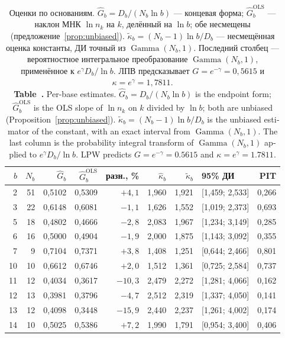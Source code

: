 \documentclass[11pt,a4paper]{article}
\newcommand{\encaptab}[1]{\\[3pt]\foreignlanguage{english}{%
  \textbf{Table~\thetable.} #1}}
\theoremstyle{plain}
\theoremstyle{remark}
\newcommand{\eg}{e^{\gamma}}
\newcommand{\emg}{e^{-\gamma}}
\DeclareMathOperator{\Gam}{Gamma}
\begin{document}
\begin{table}[t]
\centering
\caption{Оценки по основаниям. $\hat G_b=D_b/(N_b\ln b)$ --- концевая форма;
$\hat G_b^{\mathrm{OLS}}$ --- наклон МНК $\ln n_k$ на $k$, делённый на $\ln b$; обе
несмещены (предложение~\ref{prop:unbiased}). $\tilde\kappa_b=(N_b-1)\ln b/D_b$ ---
несмещённая оценка константы, ДИ точный из $\Gam(N_b,1)$. Последний столбец ---
вероятностное интегральное преобразование $\Gam(N_b,1)$, применённое к
$\eg D_b/\ln b$. ЛПВ предсказывает $G=\emg=0{,}5615$ и $\kappa=\eg=1{,}7811$.
\encaptab{Per-base estimates. $\hat G_b=D_b/(N_b\ln b)$ is the endpoint form;
$\hat G_b^{\mathrm{OLS}}$ is the OLS slope of $\ln n_k$ on $k$ divided by $\ln b$;
both are unbiased (Proposition~\ref{prop:unbiased}). $\tilde\kappa_b=(N_b-1)\ln b/D_b$
is the unbiased estimator of the constant, with an exact interval from $\Gam(N_b,1)$.
The last column is the probability integral transform of $\Gam(N_b,1)$ applied to
$\eg D_b/\ln b$. LPW predicts $G=\emg=0.5615$ and $\kappa=\eg=1.7811$.}}
\label{tab:bases}
\small
\begin{tabular}{rrrrrrrl r}
\toprule
$b$ & $N_b$ & $\hat G_b$ & $\hat G_b^{\mathrm{OLS}}$ & разн., \% &
$\hat\kappa_b$ & $\tilde\kappa_b$ & 95\% ДИ & PIT\\
\midrule
2 & 51 & 0{,}5102 & 0{,}5309 & $+4{,}1$ & 1{,}960 & 1{,}921 & [1{,}459; 2{,}533] & 0{,}266\\
3 & 22 & 0{,}6148 & 0{,}6081 & $-1{,}1$ & 1{,}626 & 1{,}552 & [1{,}019; 2{,}373] & 0{,}693\\
5 & 18 & 0{,}4802 & 0{,}4666 & $-2{,}8$ & 2{,}083 & 1{,}967 & [1{,}234; 3{,}149] & 0{,}285\\
6 & 16 & 0{,}5000 & 0{,}4904 & $-1{,}9$ & 2{,}000 & 1{,}875 & [1{,}143; 3{,}092] & 0{,}355\\
7 & 9 & 0{,}7104 & 0{,}7371 & $+3{,}8$ & 1{,}408 & 1{,}251 & [0{,}644; 2{,}466] & 0{,}801\\
10 & 10 & 0{,}6612 & 0{,}6746 & $+2{,}0$ & 1{,}512 & 1{,}361 & [0{,}725; 2{,}584] & 0{,}737\\
11 & 12 & 0{,}4034 & 0{,}3617 & $-10{,}3$ & 2{,}479 & 2{,}272 & [1{,}281; 4{,}066] & 0{,}162\\
12 & 13 & 0{,}3981 & 0{,}3796 & $-4{,}7$ & 2{,}512 & 2{,}319 & [1{,}337; 4{,}050] & 0{,}141\\
13 & 12 & 0{,}4098 & 0{,}3448 & $-15{,}9$ & 2{,}440 & 2{,}237 & [1{,}261; 4{,}002] & 0{,}174\\
14 & 10 & 0{,}5025 & 0{,}5386 & $+7{,}2$ & 1{,}990 & 1{,}791 & [0{,}954; 3{,}400] & 0{,}406\\

\end{tabular}
\end{table}
\end{document}
